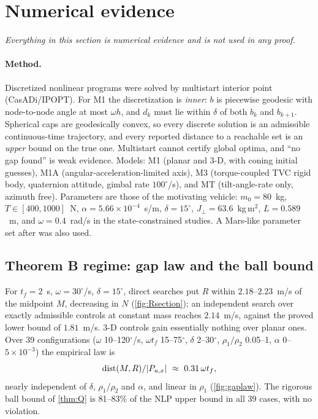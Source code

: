 \section{Numerical evidence}\label{sec:numerics}
\emph{Everything in this section is numerical evidence and is not used in any proof.}

\paragraph{Method.} Discretized nonlinear programs were solved by multistart interior point (CasADi/IPOPT). For M1 the
discretization is \emph{inner}: $b$ is piecewise geodesic with node-to-node angle at most $\omega h$, and $d_k$ must lie within
$\delta$ of both $b_k$ and $b_{k+1}$. Spherical caps are geodesically convex, so every discrete solution is an admissible
continuous-time trajectory, and every reported distance to a reachable set is an \emph{upper} bound on the true one.
Multistart cannot certify global optima, and ``no gap found'' is weak evidence. Models: M1 (planar and 3-D, with coning
initial guesses), M1A (angular-acceleration-limited axis), M3 (torque-coupled TVC rigid body, quaternion attitude, gimbal
rate $100^\circ$/s), and MT (tilt-angle-rate only, azimuth free). Parameters are those of the motivating vehicle: $m_0=80$~kg,
$T\in[400,1000]$~N, $\alpha=5.66\times10^{-4}$~s/m, $\delta=15^\circ$, $J_\perp=63.6$~kg\,m$^2$, $L=0.589$~m, and
$\omega=0.4$~rad/s in the state-constrained studies. A Mars-like parameter set after \cite{acikmese2007jgcd} was also used.

\subsection{Theorem B regime: gap law and the ball bound}
For $t_f=2$~s, $\omega=30^\circ$/s, $\delta=15^\circ$, direct searches put $R$ within $2.18$--$2.23$~m/s of the midpoint $M$, decreasing in $N$
(\cref{fig:Rsection}); an independent search over exactly admissible controls at constant mass reaches $2.14$~m/s, against
the proved lower bound of $1.81$~m/s. 3-D controls gain essentially nothing over planar ones. Over 39 configurations
($\omega$ 10--120$^\circ$/s, $\omega t_f$ 15--75$^\circ$, $\delta$ 2--30$^\circ$, $\rho_1/\rho_2$ 0.05--1, $\alpha$ 0--$5\times10^{-3}$) the
empirical law is
\[
\dist(M,R)/|P_{u,x}|\ \approx\ 0.31\,\omega t_f ,
\]
nearly independent of $\delta$, $\rho_1/\rho_2$ and $\alpha$, and linear in $\rho_1$ (\cref{fig:gaplaw}). The rigorous ball bound of
\cref{thm:Q} is 81--83\% of the NLP upper bound in all 39 cases, with no violation.

